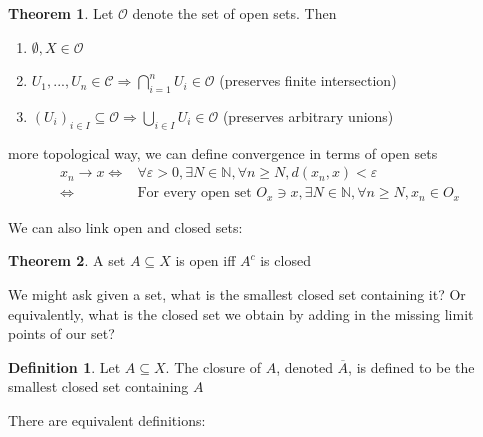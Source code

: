 \documentclass[11pt,a4paper]{article}
\theoremstyle{definition}
\newtheorem{definition}{Definition}[section]
\newtheorem{theorem}{Theorem}[section]
\begin{document}
\begin{theorem}
    Let $\mathcal{O}$ denote the set of open sets. Then
    \begin{enumerate}
        \item $\emptyset, X \in \mathcal{O}$
        \item $U_1,...,U_n \in \mathcal{C} \Longrightarrow \bigcap \limits _{i=1}^n U_i \in \mathcal{O}$ (preserves finite intersection)
        \item $(U_i)_{i \in I} \subseteq \mathcal{O} \Longrightarrow \bigcup \limits _{i \in I}U_i \in \mathcal{O}$ (preserves arbitrary unions)
    \end{enumerate}
\end{theorem}
\noindent more topological way, we can define convergence in terms of open sets
\begin{align*}
    x_n \to x \iff & \forall \varepsilon>0, \exists N \in \mathbb{N}, \forall n \ge N, d(x_n, x)< \varepsilon \\
    \iff & \text{For every open set } O_x \ni x, \exists N \in \mathbb{N}, \forall n \ge N, x_n \in O_x
\end{align*}

We can also link open and closed sets:

\begin{theorem}
    A set $A \subseteq X$ is open iff $A^c$ is closed
\end{theorem}

\noindent We might ask given a set, what is the smallest closed set containing it? Or equivalently, what is the closed set we obtain by adding in the missing limit points of our set?
\begin{definition}
    Let $A \subseteq X$. The closure of $A$, denoted $\overline{A}$, is defined to be the smallest closed set containing $A$
\end{definition}
\noindent
There are equivalent definitions:
\end{document}
